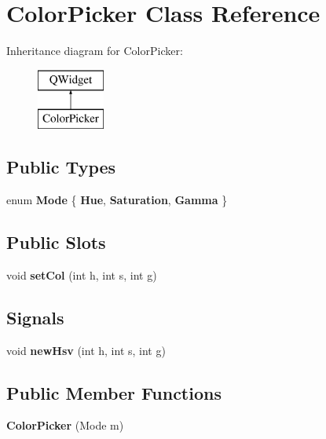 \hypertarget{class_color_picker}{}\section{Color\+Picker Class Reference}
\label{class_color_picker}
Inheritance diagram for Color\+Picker\+:\begin{figure}[H]
\begin{center}
\leavevmode
\includegraphics[height=2.000000cm]{class_color_picker}
\end{center}
\end{figure}
\subsection*{Public Types}
\begin{DoxyCompactItemize}
\item 
\mbox{\label{class_color_picker_aedde1e35d1e2d87b4d834b0642db277f}} 
enum {\bfseries Mode} \{ {\bfseries Hue}, 
{\bfseries Saturation}, 
{\bfseries Gamma}
 \}
\end{DoxyCompactItemize}
\subsection*{Public Slots}
\begin{DoxyCompactItemize}
\item 
\mbox{\label{class_color_picker_ad0c1604896c745f11f1368ff4b64382f}} 
void {\bfseries set\+Col} (int h, int s, int g)
\end{DoxyCompactItemize}
\subsection*{Signals}
\begin{DoxyCompactItemize}
\item 
\mbox{\label{class_color_picker_ae507629d5160af8c6b206b2901de5b2f}} 
void {\bfseries new\+Hsv} (int h, int s, int g)
\end{DoxyCompactItemize}
\subsection*{Public Member Functions}
\begin{DoxyCompactItemize}
\item 
\mbox{\label{class_color_picker_af286c2198e135f3d42bf37111be3803b}} 
{\bfseries Color\+Picker} (Mode m)
\end{DoxyCompactItemize}
